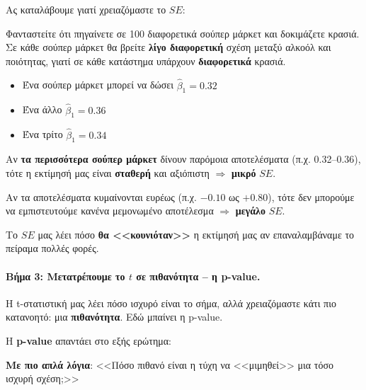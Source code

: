 \documentclass[12pt,a4paper]{article}
\begin{document}
\begin{theorybox}
Ας καταλάβουμε γιατί χρειαζόμαστε το $SE$:

Φανταστείτε ότι πηγαίνετε σε 100 διαφορετικά σούπερ μάρκετ και δοκιμάζετε κρασιά. Σε κάθε σούπερ μάρκετ θα βρείτε \textbf{λίγο διαφορετική} σχέση μεταξύ αλκοόλ και ποιότητας, γιατί σε κάθε κατάστημα υπάρχουν \textbf{διαφορετικά} κρασιά.

\begin{itemize}
    \item Ένα σούπερ μάρκετ μπορεί να δώσει $\hat{\beta}_1 = 0.32$
    \item Ένα άλλο $\hat{\beta}_1 = 0.36$
    \item Ένα τρίτο $\hat{\beta}_1 = 0.34$
\end{itemize}

Αν \textbf{τα περισσότερα σούπερ μάρκετ} δίνουν παρόμοια αποτελέσματα (π.χ. 0.32--0.36), τότε η εκτίμησή μας είναι \textbf{σταθερή} και αξιόπιστη $\Rightarrow$ \textbf{μικρό} $SE$.

Αν τα αποτελέσματα κυμαίνονται ευρέως (π.χ. $-0.10$ ως $+0.80$), τότε δεν μπορούμε να εμπιστευτούμε κανένα μεμονωμένο αποτέλεσμα $\Rightarrow$ \textbf{μεγάλο} $SE$.

Το $SE$ μας λέει πόσο \textbf{θα <<κουνιόταν>>} η εκτίμησή μας αν επαναλαμβάναμε το πείραμα πολλές φορές.
\end{theorybox}

\paragraph{Βήμα 3: Μετατρέπουμε το $t$ σε πιθανότητα -- η p-value.}

Η t-στατιστική μας λέει πόσο ισχυρό είναι το σήμα, αλλά χρειαζόμαστε κάτι πιο κατανοητό: μια \textbf{πιθανότητα}. Εδώ μπαίνει η p-value.

\begin{theorybox}
Η \textbf{p-value} απαντάει στο εξής ερώτημα:

\begin{center}
\end{center}

\textbf{Με πιο απλά λόγια}: <<Πόσο πιθανό είναι η τύχη να <<μιμηθεί>> μια τόσο ισχυρή σχέση;>>
\end{theorybox}
\end{document}
